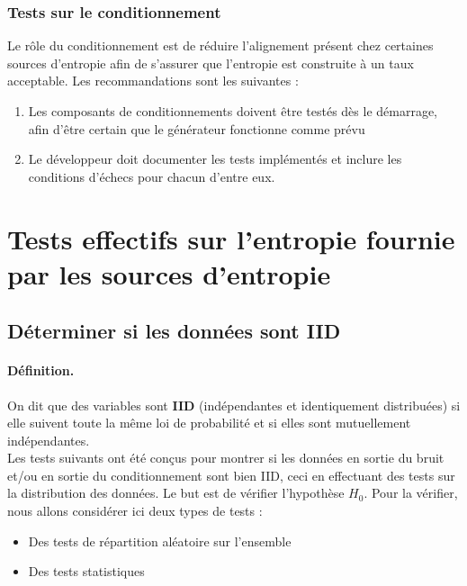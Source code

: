 \subsubsection{Tests sur le conditionnement}
Le rôle du conditionnement est de réduire l'alignement présent chez certaines sources d'entropie afin de s'assurer que l'entropie est construite à un taux acceptable. Les recommandations sont les suivantes :
\begin{enumerate}
\item Les composants de conditionnements doivent être testés dès le démarrage, afin d'être certain que le générateur fonctionne comme prévu
\item Le développeur doit documenter les tests implémentés et inclure les conditions d'échecs pour chacun d'entre eux.
\end{enumerate}



\section{Tests effectifs sur l'entropie fournie par les sources d'entropie}

\subsection{Déterminer si les données sont IID}

\paragraph{Définition.\\}
On dit que des variables sont \textbf{IID} (indépendantes et identiquement distribuées) si elle suivent toute la même loi de probabilité et si elles sont mutuellement indépendantes. \\

Les tests suivants ont été conçus pour montrer si les données en sortie du bruit et/ou en sortie du conditionnement sont bien IID, ceci en effectuant des tests sur la distribution des données. Le but est de vérifier l'hypothèse $H_0$. Pour la vérifier, nous allons considérer ici deux types de tests : 
\begin{itemize}
\item Des tests de répartition aléatoire sur l'ensemble
\item Des tests statistiques\\
\end{itemize}

